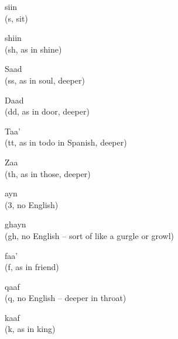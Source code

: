 \documentclass[avery5371,grid,frame]{flashcards}
\begin{document}
\begin{flashcard}{\LARGE siin \\ (s, sit)}
\LARGE {}
\end{flashcard}
\begin{flashcard}{\LARGE shiin \\ (sh, as in shine)}
\LARGE {}
\end{flashcard}
\begin{flashcard}{\LARGE Saad \\ (ss, as in soul, deeper)}
\LARGE {}
\end{flashcard}
\begin{flashcard}{\LARGE Daad \\ (dd, as in door, deeper)}
\LARGE {}
\end{flashcard}
\begin{flashcard}{\LARGE Taa' \\ (tt, as in todo in Spanish, deeper)}
\LARGE {}
\end{flashcard}
\begin{flashcard}{\LARGE Zaa \\ (th, as in those, deeper)}
\LARGE {}
\end{flashcard}
\begin{flashcard}{\LARGE ayn \\ (3, no English)}
\LARGE {}
\end{flashcard}
\begin{flashcard}{\LARGE ghayn \\ (gh, no English -- sort of like a gurgle or growl)}
\LARGE {}
\end{flashcard}
\begin{flashcard}{\LARGE faa' \\ (f, as in friend)}
\LARGE {}
\end{flashcard}
\begin{flashcard}{\LARGE qaaf \\ (q, no English -- deeper in throat)}
\LARGE {}
\end{flashcard}
\begin{flashcard}{\LARGE kaaf \\ (k, as in king)}
\LARGE {}
\end{flashcard}
\end{document}
